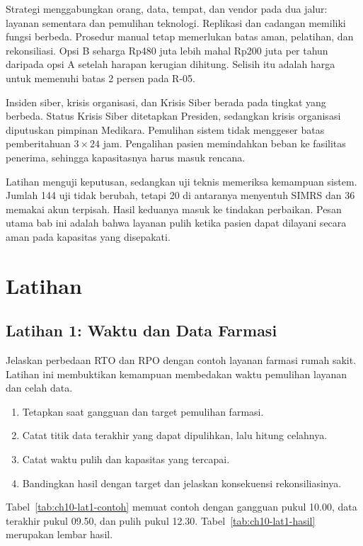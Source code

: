 Strategi menggabungkan orang, data, tempat, dan vendor pada dua jalur: layanan sementara dan
pemulihan teknologi. Replikasi dan cadangan memiliki fungsi berbeda. Prosedur manual tetap
memerlukan batas aman, pelatihan, dan rekonsiliasi. Opsi B seharga Rp480 juta lebih mahal Rp200
juta per tahun daripada opsi A setelah harapan kerugian dihitung. Selisih itu adalah harga untuk
memenuhi batas 2 persen pada R-05.

Insiden siber, krisis organisasi, dan Krisis Siber berada pada tingkat yang berbeda. Status Krisis
Siber ditetapkan Presiden, sedangkan krisis organisasi diputuskan pimpinan Medikara. Pemulihan
sistem tidak menggeser batas pemberitahuan $3 \times 24$ jam. Pengalihan pasien memindahkan beban
ke fasilitas penerima, sehingga kapasitasnya harus masuk rencana.

Latihan menguji keputusan, sedangkan uji teknis memeriksa kemampuan sistem. Jumlah 144 uji tidak
berubah, tetapi 20 di antaranya menyentuh SIMRS dan 36 memakai akun terpisah. Hasil keduanya masuk
ke tindakan perbaikan. Pesan utama bab ini adalah bahwa layanan pulih ketika pasien dapat dilayani
secara aman pada kapasitas yang disepakati.

\section{Latihan}

\subsection*{Latihan 1: Waktu dan Data Farmasi}

Jelaskan perbedaan RTO dan RPO dengan contoh layanan farmasi rumah sakit. Latihan ini membuktikan
kemampuan membedakan waktu pemulihan layanan dan celah data.

\begin{enumerate}
  \item Tetapkan saat gangguan dan target pemulihan farmasi.
  \item Catat titik data terakhir yang dapat dipulihkan, lalu hitung celahnya.
  \item Catat waktu pulih dan kapasitas yang tercapai.
  \item Bandingkan hasil dengan target dan jelaskan konsekuensi rekonsiliasinya.
\end{enumerate}

Tabel~\ref{tab:ch10-lat1-contoh} memuat contoh dengan gangguan pukul 10.00, data terakhir pukul
09.50, dan pulih pukul 12.30. Tabel~\ref{tab:ch10-lat1-hasil} merupakan lembar hasil.

